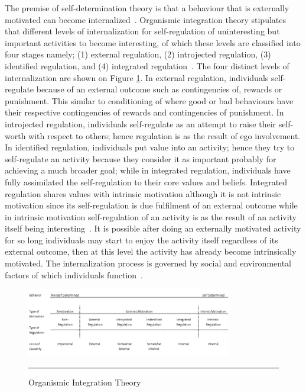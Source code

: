 The premise of self-determination theory is that a behaviour that is externally motivated can become internalized~\citep{ryan2000intrinsic}.
Organismic integration theory stipulates that different levels of internalization for self-regulation of uninteresting but important activities to become interesting, of which these levels are classified into four stages namely; (1) external regulation, (2) introjected regulation, (3) identified regulation, and (4) integrated regulation~\citep{ryan2000intrinsic}. The four distinct levels of internalization are shown on Figure \ref{figure:oit}. In external regulation, individuals self-regulate because of an external outcome such as contingencies of, rewards or punishment. This similar to conditioning of where good or bad behaviours have their respective contingencies of rewards and contingencies of punishment. In introjected regulation, individuals self-regulate as an attempt to raise their self-worth with respect to others; hence regulation is as the result of ego involvement. In identified regulation, individuals put value into an activity; hence they try to self-regulate an activity because they consider it as important probably for achieving a much broader goal; while in integrated regulation, individuals have fully assimilated the self-regulation to their core values and beliefs. Integrated regulation shares values with intrinsic motivation although it is not intrinsic motivation since its self-regulation is due fulfilment of an external outcome while in intrinsic motivation self-regulation of an activity is as the result of an activity itself being interesting~\citep{ryan2000intrinsic}. It is possible after doing an externally motivated activity for so long individuals may start to enjoy the activity itself regardless of its external outcome, then at this level the activity has already become intrinsically motivated. The internalization process is governed by social and environmental factors of which individuals function~\citep{ryan2000:self,lee2015:relating}.

\begin{figure}[htbp]
  \centering
    \includegraphics[width=0.8\textwidth]{Figures/oit.png}
    \rule{35em}{0.5pt}
  \caption{Organismic Integration Theory~\citep{ryan2000intrinsic}}
  \label{figure:oit}
\end{figure}

